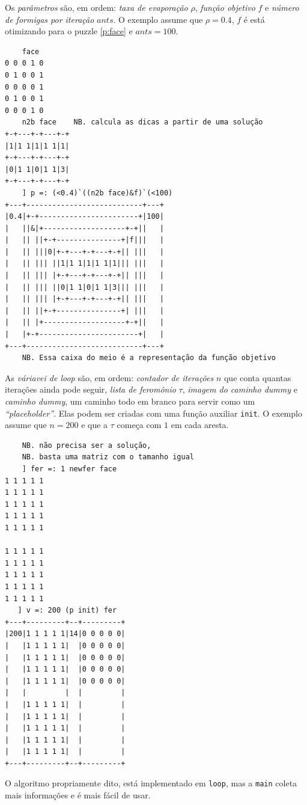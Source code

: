 \documentclass{article}
\newcommand{\inlcode}{\texttt}
\begin{document}
Os \emph{parâmetros} são, em ordem:
\emph{taxa de evaporação} \(\rho\),
\emph{função objetivo} \(f\) e
\emph{número de formigas por iteração} \(ants\).
O exemplo assume que \(\rho = 0.4\),
\(f\) é está otimizando para o puzzle \ref{p:face} e
\(ants = 100\).
\begin{verbatim}
    face
0 0 0 1 0
0 1 0 0 1
0 0 0 0 1
0 1 0 0 1
0 0 0 1 0
    n2b face    NB. calcula as dicas a partir de uma solução
+-+---+-+---+-+
|1|1 1|1|1 1|1|
+-+---+-+---+-+
|0|1 1|0|1 1|3|
+-+---+-+---+-+
    ] p =: (<0.4)`((n2b face)&f)`(<100)
+---+---------------------------+---+
|0.4|+-+-----------------------+|100|
|   ||&|+-------------------+-+||   |
|   || ||+-+---------------+|f|||   |
|   || |||0|+-+---+-+---+-+|| |||   |
|   || ||| ||1|1 1|1|1 1|1||| |||   |
|   || ||| |+-+---+-+---+-+|| |||   |
|   || ||| ||0|1 1|0|1 1|3||| |||   |
|   || ||| |+-+---+-+---+-+|| |||   |
|   || ||+-+---------------+| |||   |
|   || |+-------------------+-+||   |
|   |+-+-----------------------+|   |
+---+---------------------------+---+
    NB. Essa caixa do meio é a representação da função objetivo
\end{verbatim}

As \emph{váriavei de loop} são, em ordem:
\emph{contador de iterações} \(n\)
que conta quantas iterações ainda pode seguir,
\emph{lista de feromônio} \(\tau\),
\emph{imagem do caminho \emph{dummy}} e
\emph{caminho \emph{dummy}},
um caminho todo em branco para
servir como um \emph{``placeholder''}.
Elas podem ser criadas
com uma função auxiliar \inlcode{init}.
O exemplo assume que \(n = 200\) e
que a \(\tau\) começa com \(1\) em cada aresta.
\begin{verbatim}
    NB. não precisa ser a solução,
    NB. basta uma matriz com o tamanho igual
    ] fer =: 1 newfer face
1 1 1 1 1
1 1 1 1 1
1 1 1 1 1
1 1 1 1 1
1 1 1 1 1

1 1 1 1 1
1 1 1 1 1
1 1 1 1 1
1 1 1 1 1
1 1 1 1 1
   ] v =: 200 (p init) fer
+---+---------+--+---------+
|200|1 1 1 1 1|14|0 0 0 0 0|
|   |1 1 1 1 1|  |0 0 0 0 0|
|   |1 1 1 1 1|  |0 0 0 0 0|
|   |1 1 1 1 1|  |0 0 0 0 0|
|   |1 1 1 1 1|  |0 0 0 0 0|
|   |         |  |         |
|   |1 1 1 1 1|  |         |
|   |1 1 1 1 1|  |         |
|   |1 1 1 1 1|  |         |
|   |1 1 1 1 1|  |         |
|   |1 1 1 1 1|  |         |
+---+---------+--+---------+
\end{verbatim}

O algoritmo propriamente dito,
está implementado em \inlcode{loop},
mas a \inlcode{main} coleta mais informações e
é mais fácil de usar.
\end{document}
